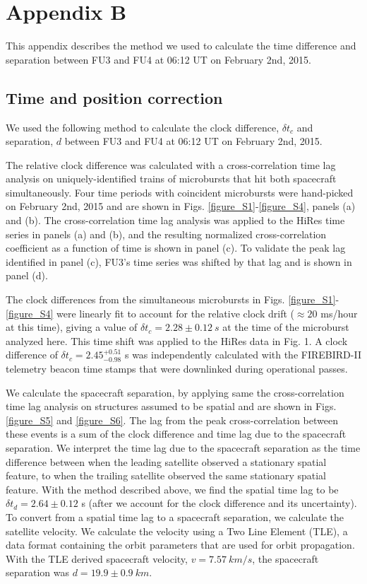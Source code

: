 
\chapter{Appendix B}\label{appendixb}
This appendix describes the method we used to calculate the time difference and separation between FU3 and FU4 at 06:12 UT on February 2nd, 2015.

\section{Time and position correction} 

We used the following method to calculate the clock difference, $\delta t_{c}$  and separation, $d$ between FU3 and FU4 at 06:12 UT on February 2nd, 2015.

The relative clock difference was calculated with a cross-correlation time lag analysis on uniquely-identified trains of microbursts that hit both spacecraft simultaneously. Four time periods with coincident microbursts were hand-picked on February 2nd, 2015 and are shown in Figs. \ref{figure_S1}-\ref{figure_S4}, panels (a) and (b). The cross-correlation time lag analysis was applied to the HiRes time series in panels (a) and (b), and the resulting normalized cross-correlation coefficient as a function of time is shown in panel (c). To validate the peak lag identified in panel (c), FU3's time series was shifted by that lag and is shown in panel (d).

The clock differences from the simultaneous microbursts in Figs. \ref{figure_S1}-\ref{figure_S4} were linearly fit to account for the relative clock drift (${\approx} 20$ ms/hour at this time), giving a value of $\delta t_{c} = 2.28 \pm 0.12 \ s$ at the time of the microburst analyzed here. This time shift was applied to the HiRes data in Fig. 1. A clock difference of $\delta t_{c}  = 2.45^{+ 0.51}_{-0.98}$ s was independently calculated with the FIREBIRD-II telemetry beacon time stamps that were downlinked during operational passes.

We calculate the spacecraft separation, by applying same the cross-correlation time lag analysis on structures assumed to be spatial and are shown in Figs. \ref{figure_S5} and \ref{figure_S6}. The lag from the peak cross-correlation between these events is a sum of the clock difference and time lag due to the spacecraft separation. We interpret the time lag due to the spacecraft separation as the time difference between when the leading satellite observed a stationary spatial feature, to when the trailing satellite observed the same stationary spatial feature. With the method described above, we find the spatial time lag to be $\delta t_{d} = 2.64 \pm 0.12$ s (after we account for the clock difference and its uncertainty). To convert from a spatial time lag to a spacecraft separation, we calculate the satellite velocity. We calculate the velocity using a Two Line Element (TLE), a data format containing the orbit parameters that are used for orbit propagation. With the TLE derived spacecraft velocity, $v = 7.57 \ km/s$, the spacecraft separation was $d = 19.9 \pm 0.9 \ km $.

